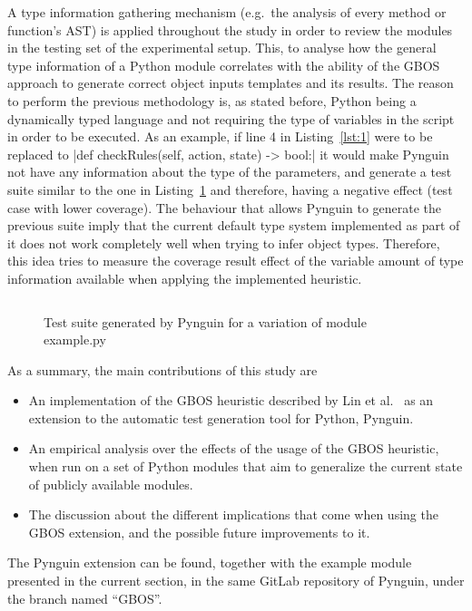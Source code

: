 \documentclass[%
  chapterprefix=false,%
  open=right,%
  twoside=true,%
  paper=a4,%
  logofile={Figures/logo.png},%
  thesistype=master,%
  UKenglish,%
]{se2thesis}
\begin{document}
A type information gathering mechanism (e.g.~the analysis of every method or function's AST) is applied throughout the study in order to review the modules in the testing set of the experimental setup.
This, to analyse how the general type information of a Python module correlates with the ability of the GBOS approach to generate correct object inputs templates and its results.
The reason to perform the previous methodology is, as stated before, Python being a dynamically typed language and not requiring the type of variables in the script in order to be executed.
As an example, if line 4 in Listing~\ref{lst:1} were to be replaced to |def checkRules(self, action, state) -> bool:| it would make Pynguin not have any information about the type of the parameters, and generate a test suite similar to the one in Listing~\ref{lst:5} and therefore, having a negative effect (test case with lower coverage).
The behaviour that allows Pynguin to generate the previous suite imply that the current default type system implemented as part of it does not work completely well when trying to infer object types.
Therefore, this idea tries to measure the coverage result effect of the variable amount of type information available when applying the implemented heuristic.

\begin{figure}
  \inputminted[linenos]{python}{Figures/test2.py}
  \caption{Test suite generated by Pynguin for a variation of module example.py\label{lst:5}}
\end{figure}

As a summary, the main contributions of this study are

\begin{itemize}
  \item An implementation of the GBOS heuristic described by Lin et al.~\cite{DBLP:conf/sigsoft/0001O00D21} as an extension to the automatic test generation tool for Python, Pynguin.
  \item An empirical analysis over the effects of the usage of the GBOS heuristic, when run on a set of Python modules that aim to generalize the current state of publicly available modules.
  \item The discussion about the different implications that come when using the GBOS extension, and the possible future improvements to it.
\end{itemize}

The Pynguin extension can be found, together with the example module presented in the current section, in the same GitLab repository of Pynguin, under the branch named ``GBOS''.
\end{document}
